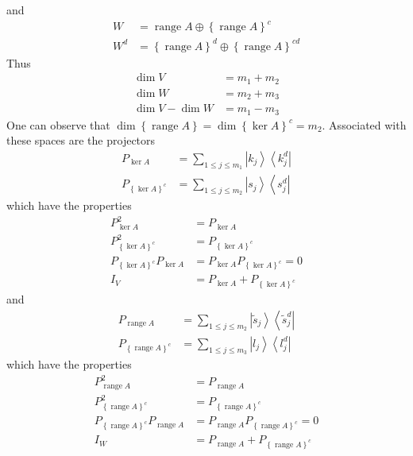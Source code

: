 \documentclass[aps,preprint]{revtex4}%
\begin{document}
and
\begin{align}
W  & =\operatorname{range}A\oplus\left\{  \operatorname{range}A\right\}
^{c}\nonumber\\
W^{d}  & =\left\{  \operatorname{range}A\right\}  ^{d}\oplus\left\{
\operatorname{range}A\right\}  ^{cd}%
\end{align}
Thus
\begin{align}
\dim V  & =m_{1}+m_{2}\nonumber\\
\dim W  & =m_{2}+m_{3}\nonumber\\
\dim V-\dim W  & =m_{1}-m_{3}%
\end{align}
One can observe that $\dim\left\{  \operatorname{range}A\right\}
=\dim\left\{  \ker A\right\}  ^{c}=m_{2}$. Associated with these spaces are
the projectors
\begin{align}
P_{\ker A}  & =\sum_{1\leq j\leq m_{1}}\left|  k_{j}\right\rangle \left\langle
k_{j}^{d}\right| \nonumber\\
P_{\left\{  \ker A\right\}  ^{c}}  & =\sum_{1\leq j\leq m_{2}}\left|
s_{j}\right\rangle \left\langle s_{j}^{d}\right|
\end{align}
which have the properties%
\begin{align}
P_{\ker A}^{2}  & =P_{\ker A}\nonumber\\
P_{\left\{  \ker A\right\}  ^{c}}^{2}  & =P_{\left\{  \ker A\right\}  ^{c}%
}\nonumber\\
P_{\left\{  \ker A\right\}  ^{c}}P_{\ker A}  & =P_{\ker A}P_{\left\{  \ker
A\right\}  ^{c}}=0\nonumber\\
I_{V}  & =P_{\ker A}+P_{\left\{  \ker A\right\}  ^{c}}%
\end{align}
and
\begin{align}
P_{\operatorname{range}A}  & =\sum_{1\leq j\leq m_{2}}\left|  \tilde{s}%
_{j}\right\rangle \left\langle \tilde{s}_{j}^{d}\right| \nonumber\\
P_{\left\{  \operatorname{range}A\right\}  ^{c}}  & =\sum_{1\leq j\leq m_{3}%
}\left|  l_{j}\right\rangle \left\langle l_{j}^{d}\right|
\end{align}
which have the properties%
\begin{align}
P_{\operatorname{range}A}^{2}  & =P_{\operatorname{range}A}\nonumber\\
P_{\left\{  \operatorname{range}A\right\}  ^{c}}^{2}  & =P_{\left\{
\operatorname{range}A\right\}  ^{c}}\nonumber\\
P_{\left\{  \operatorname{range}A\right\}  ^{c}}P_{\operatorname{range}A}  &
=P_{\operatorname{range}A}P_{\left\{  \operatorname{range}A\right\}  ^{c}%
}=0\nonumber\\
I_{W}  & =P_{\operatorname{range}A}+P_{\left\{  \operatorname{range}A\right\}
^{c}}%
\end{align}
\end{document}
